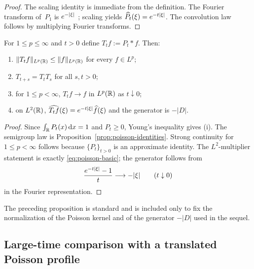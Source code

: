 \begin{proof}
The scaling identity is immediate from the definition.  The Fourier
transform of~$P_1$ is $e^{-\lvert \xi\rvert}$
\cite[Chapter~III]{Stein1971}; scaling yields
$\widehat{P_t}(\xi)=e^{-t\lvert \xi\rvert}$.  The convolution law follows by
multiplying Fourier transforms.
\end{proof}

\begin{proposition}%
\label{thm:poisson-semigroup-law}
For $1\le p\le\infty$ and $t>0$ define
$T_t f:=P_t*f$.  Then:
\begin{enumerate}[label=(\roman*)]
\item $\|T_t f\|_{L^p(\mathbb{R})}\le \|f\|_{L^p(\mathbb{R})}$ for every $f\in L^p$;
\item $T_{t+s}=T_tT_s$ for all $s,t>0$;
\item for $1\le p<\infty$, $T_t f\to f$ in $L^p(\mathbb{R})$ as $t\downarrow 0$;
\item on $L^2(\mathbb{R})$, $\widehat{T_t f}(\xi)=e^{-t\lvert \xi\rvert}\widehat f(\xi)$
      and the generator is $-|D|$.
\end{enumerate}
\end{proposition}

\begin{proof}
Since $\int_{\mathbb{R}}P_t(x)\,\mathrm{d} x=1$ and $P_t\ge 0$, Young's inequality gives
(i).  The semigroup law is Proposition~\ref{prop:poisson-identities}.
Strong continuity for $1\le p<\infty$ follows because $\{P_t\}_{t>0}$ is
an approximate identity.  The $L^2$-multiplier statement is exactly
\eqref{eq:poisson-basic}; the generator follows from
\[
\frac{e^{-t\lvert \xi\rvert}-1}{t}\longrightarrow -\lvert \xi\rvert
\qquad(t\downarrow 0)
\]
in the Fourier representation.
\end{proof}

\begin{remark}
The preceding proposition is standard and is included only to fix the
normalization of the Poisson kernel and of the generator $-|D|$ used in
the sequel.
\end{remark}

\subsection{Large-time comparison with a translated Poisson profile}


